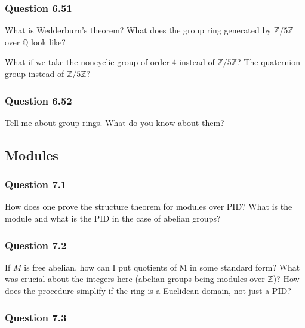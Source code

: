 \hypertarget{question-6.51}{%
\subsubsection{Question 6.51}\label{question-6.51}}

What is Wedderburn's theorem? What does the group ring generated by
\({\mathbb{Z}}/5{\mathbb{Z}}\) over \({\mathbb{Q}}\) look like?

What if we take the noncyclic group of order 4 instead of
\({\mathbb{Z}}/5{\mathbb{Z}}\)? The quaternion group instead of
\({\mathbb{Z}}/5{\mathbb{Z}}\)?

\hypertarget{question-6.52}{%
\subsubsection{Question 6.52}\label{question-6.52}}

Tell me about group rings. What do you know about them?

\hypertarget{modules-1}{%
\subsection{Modules}\label{modules-1}}

\hypertarget{question-7.1}{%
\subsubsection{Question 7.1}\label{question-7.1}}

How does one prove the structure theorem for modules over PID? What is
the module and what is the PID in the case of abelian groups?

\hypertarget{question-7.2}{%
\subsubsection{Question 7.2}\label{question-7.2}}

If \(M\) is free abelian, how can I put quotients of M in some standard
form? What was crucial about the integers here (abelian groups being
modules over \({\mathbb{Z}}\))? How does the procedure simplify if the
ring is a Euclidean domain, not just a PID?

\hypertarget{question-7.3}{%
\subsubsection{Question 7.3}\label{question-7.3}}

